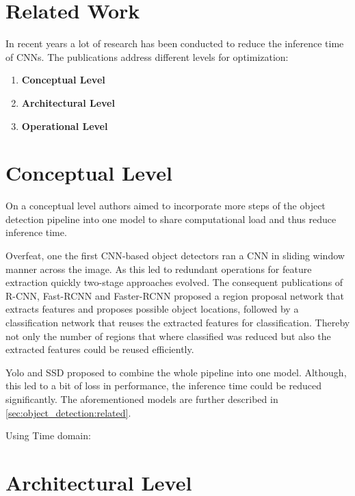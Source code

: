 \section{Related Work}
\label{sec:tradeoff:related_work}

In recent years a lot of research has been conducted to reduce the inference time of \acp{CNN}. The publications address different levels for optimization:
\begin{enumerate}
	\item \textbf{Conceptual Level}
	\item \textbf{Architectural Level}
	\item \textbf{Operational Level}
\end{enumerate}

\section{Conceptual Level}
 On a conceptual level authors aimed to incorporate more steps of the object detection pipeline into one model to share computational load and thus reduce inference time.
 
 Overfeat, one the first \ac{CNN}-based object detectors ran a \ac{CNN} in sliding window manner across the image. As this led to redundant operations for feature extraction quickly two-stage approaches evolved. The consequent publications of R-CNN, Fast-RCNN and Faster-RCNN proposed a region proposal network that extracts features and proposes possible object locations, followed by a classification network that reuses the extracted features for classification. Thereby not only the number of regions that where classified was reduced but also the extracted features could be reused efficiently.
 
 Yolo and SSD proposed to combine the whole pipeline into one model. Although, this led to a bit of loss in performance, the inference time could be reduced significantly. The aforementioned models are further described in \autoref{sec:object_detection:related}.
 
 Using Time domain:
 \cite{Chen2018}
 
 
\section{Architectural Level}

